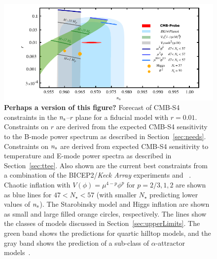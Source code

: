 \begin{figure}[ht]
\begin{center}
\includegraphics[width=6in]{figs/nsrlabeledrp01v1}
\end{center}
\caption{{\bf Perhaps a version of this figure?} Forecast of CMB-S4 constraints in the $n_{\rm s}$--$r$ plane for a fiducial model with $r=0.01$. Constraints 
on $r$ are derived from the expected CMB-S4 sensitivity to the B-mode power spectrum as described in 
Section~\ref{sec:needs}. Constraints on $n_{\rm s}$ are derived from expected CMB-S4 sensitivity to temperature and 
E-mode power spectra as described in Section~\ref{sec:ttee}. Also shown are the current best constraints from a combination of the { BICEP}2/{\em Keck Array} experiments and \planck\ \cite{Array:2015xqh}. Chaotic inflation with $V(\phi)=\mu^{4-p}\phi^p$ for \mbox{$p=2/3,1,2$} are shown as blue lines for $47<N_\star<57$ (with smaller $N_\star$ predicting lower values of $n_{\rm s}$). The Starobinsky model and Higgs inflation are shown as small and large filled orange circles, respectively. The lines show the classes of models discussed in Section~\ref{sec:upperLimits}. The green band shows the predictions for quartic hilltop models, and the gray band shows the prediction of a sub-class of $\alpha$-attractor models~\cite{Kallosh:2013hoa}.
}
\label{fig:nsrp01}
\end{figure}


